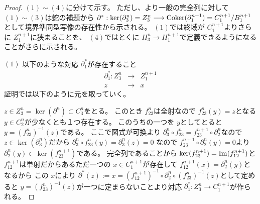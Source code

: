 \documentclass[dvipdfmx]{jsarticle}
\begin{document}
\begin{proof}
  $(1) \sim (4)$に分けて示す。
  ただし、より一般の完全列に対して $(1) \sim (3)$は蛇の補題から $\partial^* : \ker(\partial^n_3) = Z^n_3 \longrightarrow \mathop{\mathrm{Coker}}\nolimits(\partial^{n+1}_1) = C^{n+1}_1 / B^{n+1}_1$として境界準同型写像の存在性から示される。
  $(1)$では終域が $C^{n+1}_1$よりさらに $Z^{n+1}_1$に狭まることを、
  $(4)$ではとくに $H^n_3 \longrightarrow H^{n+1}_1$で定義できるようになることがさらに示される。

  $(1)$
  以下のような対応 $\partial^*_1$が存在すること
  \begin{eqnarray*}
    \partial^*_1 : Z^n_3 & \longrightarrow & Z^{n+1}_1 \\
    z & \longrightarrow & x
  \end{eqnarray*}
  証明では以下のように元を取っていく。
  \begin{center}
  \end{center}

  $z \in Z^n_3 = \ker(\partial^n) \subset C^n_3$をとる。
  このとき $f_{23}^n$は全射なので $f_{23}^n(y) = z$となる $y \in C^n_2$が少なくとも１つ存在する。
  このうちの一つを $y$としてとると $y = (f_{23}^n)^{-1}(z)$である。
  ここで図式が可換より $\partial^n_3 \circ f_{23}^n = f_{23}^{n+1} \circ \partial^n_2$なので
  $z \in \ker(\partial^n_3)$だから
  $\partial^n_3 \circ f_{23}^n(y) = \partial^n_3(z) = 0$
  なので $f_{23}^{n+1} \circ \partial^n_2(y) = 0$より $\partial^n_2(y) \in \ker(f_{23}^{n+1})$である。
  完全列であることから $\ker(f_{23}^{n+1}) = \mathop{\mathrm{Im}}\nolimits(f_{12}^{n+1})$と
  $f_{12}^{n+1}$は単射だからあるただ一つの $x \in C^{n+1}_1$が存在して
  $f_{12}^{n+1}(x) = \partial^n_2(y)$となるから
  この $x$により $\partial^*(z) := x = (f_{12}^{n+1})^{-1} \circ \partial^n_2 \circ (f_{23}^n)^{-1}(z)$として定めると
  $y = (f_{23}^n)^{-1}(z)$が一つに定まらないことより対応 $\partial^*_1 : Z^n_3 \longrightarrow C^{n+1}_1$が作られる。


\end{proof}
\end{document}
